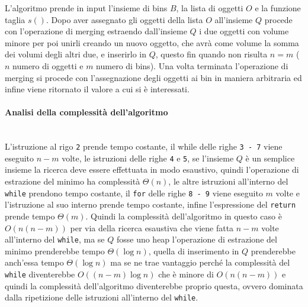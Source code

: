 \noindent
L'algoritmo prende in input l'insieme di bins $ B $, la lista di oggetti $ O $ e la funzione taglia $ s() $. Dopo aver assegnato gli oggetti della lista $ O $
all'insieme $ Q $ procede con l'operazione di merging estraendo dall'insieme $ Q $ i due oggetti con volume minore per poi unirli creando un nuovo oggetto, che
avrà come volume la somma dei volumi degli altri due, e inserirlo in $ Q $, questo fin quando non risulta $ n = m $ ($ n $ numero di oggetti e $ m $ numero di bins). 
Una volta terminata l'operazione di merging si procede con l'assegnazione degli oggetti ai bin in maniera arbitraria ed infine viene ritornato il valore a cui si è interessati.

\paragraph{Analisi della complessità dell'algoritmo}\mbox{}\\
L'istruzione al rigo \texttt{2} prende tempo costante, il while delle righe \texttt{3 - 7} viene eseguito 
$ n - m $ volte, le istruzioni delle righe \texttt{4} e \texttt{5}, se l'insieme $ Q $ è un semplice insieme la ricerca deve essere effettuata in modo esaustivo, quindi l'operazione di 
estrazione del minimo ha complessità $ \Theta(n) $, le altre istruzioni all'interno del \texttt{while} prendono tempo costante, il \texttt{for} delle righe \texttt{8 - 9} viene eseguito 
$ m $ volte e l'istruzione al suo interno prende tempo costante, infine l'espressione del \texttt{return} prende tempo $ \Theta(m) $. Quindi la complessità dell'algoritmo
in questo caso è $ O(n(n - m)) $ per via della ricerca esaustiva che viene fatta $ n - m $ volte all'interno del \texttt{while}, ma se $ Q $ fosse uno heap l'operazione di 
estrazione del minimo prenderebbe tempo $ \Theta(\log{}n) $, quella di inserimento in $ Q $ prenderebbe anch'essa tempo $ \Theta(\log{}n) $ ma se ne trae vantaggio
perché la complessità del \texttt{while} diventerebbe $ O((n - m) \log{}n) $ che è minore di $ O(n(n - m)) $ e quindi la complessità dell'algoritmo diventerebbe proprio questa,
ovvero dominata dalla ripetizione delle istruzioni all'interno del \texttt{while}.

